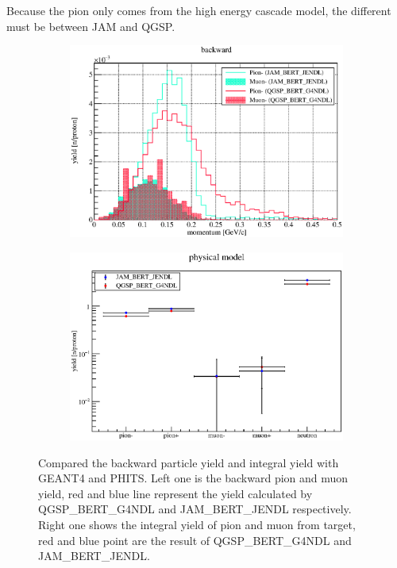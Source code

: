 Because the pion only comes from the high energy cascade model, the different must be between JAM and QGSP.
  \begin{figure}[H]
   \begin{subfigure}{0.3\textwidth}
    \centering
	\includegraphics[scale=0.43]{chapter3/fig/backward}
   \end{subfigure}
   \hspace{0.2\textwidth}
   \begin{subfigure}{0.3\textwidth}
    \centering
	\includegraphics[scale=0.43]{chapter3/fig/production}
   \end{subfigure}
   \caption{Compared the backward particle yield and integral yield with GEANT4 and PHITS. Left one is the backward pion and muon yield, red and blue line represent the yield calculated by QGSP\_BERT\_G4NDL and JAM\_BERT\_JENDL respectively. Right one shows the integral yield of pion and muon from target, red and blue point are the result of QGSP\_BERT\_G4NDL and JAM\_BERT\_JENDL.}
   \label{model}
  \end{figure}

